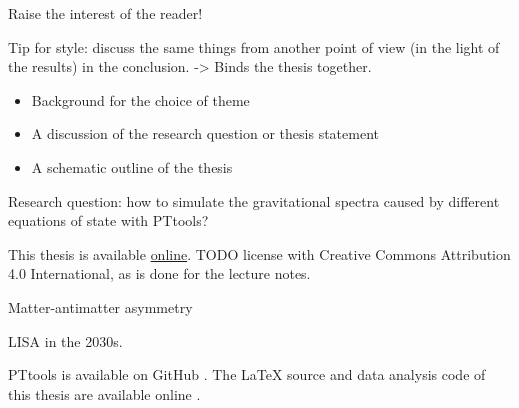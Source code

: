 Raise the interest of the reader!

Tip for style: discuss the same things from another point of view (in the light of the results) in the conclusion.
-> Binds the thesis together.

\begin{itemize}
    \item Background for the choice of theme
    \item A discussion of the research question or thesis statement
    \item A schematic outline of the thesis
\end{itemize}

Research question: how to simulate the gravitational spectra caused by different equations of state with PTtools?

This thesis is available \href{https://gitlab.com/AgenttiX/msc-thesis2}{online}.
TODO license with Creative Commons Attribution 4.0 International, as is done for the lecture notes.

Matter-antimatter asymmetry \cite{lecture_notes}

LISA in the 2030s.

PTtools is available on GitHub \cite{pttools}.
The LaTeX source and data analysis code of this thesis are available online \cite{thesis_source}.
